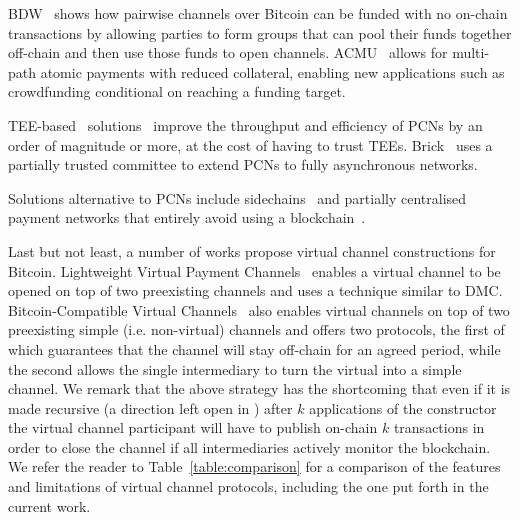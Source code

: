  BDW~\cite{scalable-funding} shows how pairwise channels over Bitcoin can be   funded with no on-chain transactions by allowing parties to form groups that   can pool their funds together off-chain and then use those funds to open   channels. ACMU~\cite{10.1145/3319535.3345666} allows for multi-path atomic   payments with reduced collateral, enabling new applications such as   crowdfunding conditional on reaching a funding target.

  TEE-based~\cite{zhao2019sok}
solutions~\cite{teechan,10.1145/3341301.3359627,liao2021speedster,lee2020routee}
  improve the throughput and efficiency of PCNs by an order of magnitude or
  more, at the cost of having to trust TEEs. Brick~\cite{avarikioti2020brick}
  uses a partially trusted committee to extend PCNs to fully asynchronous
  networks.

  Solutions alternative to PCNs include sidechains~\cite{cryptoeprint:2020:175}
  and partially centralised payment networks that entirely avoid using a blockchain~\cite{DBLP:conf/trust/ArmknechtKMYZ15,stellar,silentwhispers,DBLP:conf/ndss/RoosMKG18}. 

  Last but not least, a number of works propose virtual channel constructions
  for Bitcoin. Lightweight Virtual Payment
  Channels~\cite{10.1007/978-3-030-65411-5_18} enables a virtual channel to be
  opened on top of two preexisting channels and uses a technique similar to DMC.
  Bitcoin-Compatible Virtual Channels~\cite{cryptoeprint:2020:554} also enables
  virtual channels on top of two preexisting simple (i.e. non-virtual) channels
  and offers two protocols, the first of which guarantees that the channel will
  stay off-chain for an agreed period, while the second allows the single intermediary
  to turn the virtual into a simple channel. 
  We remark that the above strategy has the shortcoming that even if it is made
  recursive (a direction left open in \cite{cryptoeprint:2020:554}) after $k$
  applications of the constructor the virtual channel participant will have to
  publish on-chain $k$ transactions in order to close the channel if all
  intermediaries actively monitor the blockchain.
  We refer the reader to Table~\ref{table:comparison} for a comparison of the
  features and limitations of virtual channel protocols, including the one put
  forth in the current work.

